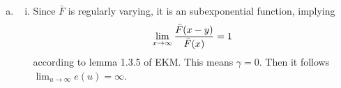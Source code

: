 \documentclass{report}
\begin{document}
\begin{enumerate}[1.]
\begin{enumerate}[(a)]
\begin{proof}
    \end{proof}

  \item
    \begin{enumerate}[(i)]
    \item Since $\bar{F}$ is regularly varying, it is an
      subexponential function, implying
      \[
      \lim_{x \to \infty} {\bar{F}(x - y) \over \bar{F}(x)} = 1
      \]
      according to lemma 1.3.5 of EKM. This means $\gamma =
      0$. Then it follows $\lim_{u \to \infty} e(u) = \infty$.


\end{enumerate}
\end{enumerate}
\end{enumerate}
\end{document}
